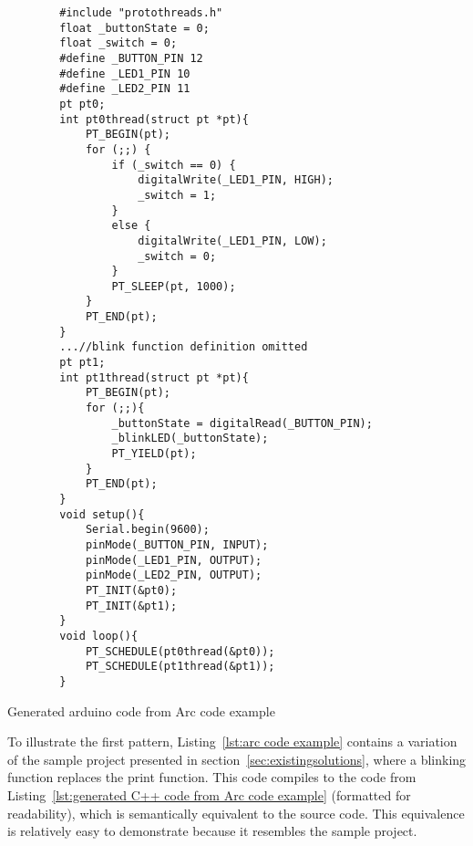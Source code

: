 \begin{listing}[htb!]
    \begin{verbatim}
        #include "protothreads.h"
        float _buttonState = 0;
        float _switch = 0;
        #define _BUTTON_PIN 12
        #define _LED1_PIN 10
        #define _LED2_PIN 11
        pt pt0;
        int pt0thread(struct pt *pt){
            PT_BEGIN(pt);
            for (;;) {
                if (_switch == 0) {
                    digitalWrite(_LED1_PIN, HIGH);
                    _switch = 1;
                }
                else {
                    digitalWrite(_LED1_PIN, LOW);
                    _switch = 0;
                }
                PT_SLEEP(pt, 1000);
            }
            PT_END(pt);
        }
        ...//blink function definition omitted
        pt pt1;
        int pt1thread(struct pt *pt){
            PT_BEGIN(pt);
            for (;;){
                _buttonState = digitalRead(_BUTTON_PIN);
                _blinkLED(_buttonState);
                PT_YIELD(pt);
            }
            PT_END(pt);
        }
        void setup(){
            Serial.begin(9600);
            pinMode(_BUTTON_PIN, INPUT);
            pinMode(_LED1_PIN, OUTPUT);
            pinMode(_LED2_PIN, OUTPUT);
            PT_INIT(&pt0);
            PT_INIT(&pt1);
        }
        void loop(){
            PT_SCHEDULE(pt0thread(&pt0));
            PT_SCHEDULE(pt1thread(&pt1));
        }
    \end{verbatim}
    \caption{Generated arduino code from Arc code example}
    \label{lst:generated C++ code from Arc code example}
\end{listing}


To illustrate the first pattern, Listing~\ref{lst:arc code example} contains a variation of the sample project presented in section~\ref{sec:existingsolutions}, where a blinking function replaces the print function. This code compiles to the code from Listing~\ref{lst:generated C++ code from Arc code example} (formatted for readability), which is semantically equivalent to the source code. This equivalence is relatively easy to demonstrate because it resembles the sample project.
